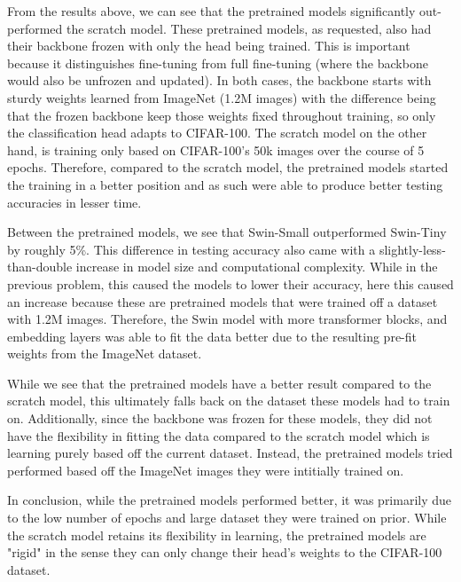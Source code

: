 \documentclass[a4paper]{article}
\begin{document}
From the results above, we can see that the pretrained models significantly out-performed the scratch model. These pretrained models, as requested, also had their backbone frozen with only the head being trained. This is important because it distinguishes fine-tuning from full fine-tuning (where the backbone would also be unfrozen and updated). In both cases, the backbone starts with sturdy weights learned from ImageNet (1.2M images) with the difference being that the frozen backbone keep those weights fixed throughout training, so only the classification head adapts to CIFAR-100. The scratch model on the other hand, is training only based on CIFAR-100's 50k images over the course of 5 epochs. Therefore, compared to the scratch model, the pretrained models started the training in a better position and as such were able to produce better testing accuracies in lesser time.

Between the pretrained models, we see that Swin-Small outperformed Swin-Tiny by roughly 5\%. This difference in testing accuracy also came with a slightly-less-than-double increase in model size and computational complexity. While in the previous problem, this caused the models to lower their accuracy, here this caused an increase because these are pretrained models that were trained off a dataset with 1.2M images. Therefore, the Swin model with more transformer blocks, and embedding layers was able to fit the data better due to the resulting pre-fit weights from the ImageNet dataset.

While we see that the pretrained models have a better result compared to the scratch model, this ultimately falls back on the dataset these models had to train on. Additionally, since the backbone was frozen for these models, they did not have the flexibility in fitting the data compared to the scratch model which is learning purely based off the current dataset. Instead, the pretrained models tried performed based off the ImageNet images they were intitially trained on.

In conclusion, while the pretrained models performed better, it was primarily due to the low number of epochs and large dataset they were trained on prior. While the scratch model retains its flexibility in learning, the pretrained models are "rigid" in the sense they can only change their head's weights to the CIFAR-100 dataset.
\end{document}
